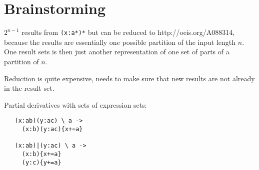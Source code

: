 \section{Brainstorming}


$2^{n-1}$ results from \texttt{(x:a*)*} but can be reduced to
http://oeis.org/A088314, because the results are essentially one possible
partition of the input length $n$. One result sets is then just another
representation of one set of parts of a partition of $n$.

Reduction is quite expensive, needs to make sure that new results are not
already in the result set.


Partial derivatives with sets of expression sets:

\begin{verbatim}
   (x:ab)(y:ac) \ a ->
     (x:b)(y:ac){x+=a}

   (x:ab)|(y:ac) \ a ->
     (x:b){x+=a}
     (y:c){y+=a}
\end{verbatim}



